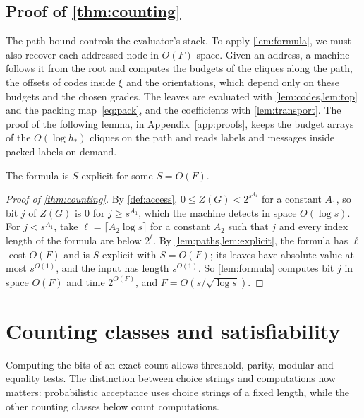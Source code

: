 \documentclass[11pt]{article}
\theoremstyle{definition}
\theoremstyle{definition}
\theoremstyle{remark}
\begin{document}
\subsection{Proof of \texorpdfstring{\cref{thm:counting}}{the counting theorem}}

The path bound controls the evaluator's stack. To apply \cref{lem:formula}, we must also recover each addressed node in $O(F)$ space. Given an address, a machine follows it from the root and computes the budgets of the cliques along the path, the offsets of codes inside $\xi$ and the orientations, which depend only on these budgets and the chosen grades. The leaves are evaluated with \cref{lem:codes,lem:top} and the packing map~\eqref{eq:pack}, and the coefficients with \cref{lem:transport}. The proof of the following lemma, in Appendix~\ref{app:proofs}, keeps the budget arrays of the $O(\log h_*)$ cliques on the path and reads labels and messages inside packed labels on demand.

\begin{lemma}\label{lem:explicit}
The formula is $S$-explicit for some $S=O(F)$.
\end{lemma}

\begin{proof}[Proof of \cref{thm:counting}]
By \cref{def:access}, $0\le Z(G)<2^{s^{A_1}}$ for a constant $A_1$, so bit $j$ of $Z(G)$ is $0$ for $j\ge s^{A_1}$, which the machine detects in space $O(\log s)$. For $j<s^{A_1}$, take $\ell=\lceil A_2\log s\rceil$ for a constant $A_2$ such that $j$ and every index length of the formula are below $2^\ell$. By \cref{lem:paths,lem:explicit}, the formula has $\ell$-cost $O(F)$ and is $S$-explicit with $S=O(F)$; its leaves have absolute value at most $s^{O(1)}$, and the input has length $s^{O(1)}$. So \cref{lem:formula} computes bit $j$ in space $O(F)$ and time $2^{O(F)}$, and $F=O(s/\sqrt{\log s})$.
\end{proof}

\section{Counting classes and satisfiability}\label{sec:consequences}

Computing the bits of an exact count allows threshold, parity, modular and equality tests. The distinction between choice strings and computations now matters: probabilistic acceptance uses choice strings of a fixed length, while the other counting classes below count computations.
\end{document}
